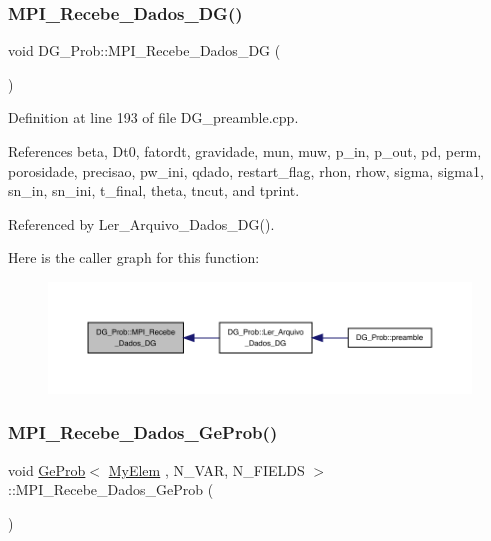 \subsubsection{\texorpdfstring{M\+P\+I\+\_\+\+Recebe\+\_\+\+Dados\+\_\+\+D\+G()}{MPI\_Recebe\_Dados\_DG()}}
{\footnotesize\ttfamily void D\+G\+\_\+\+Prob\+::\+M\+P\+I\+\_\+\+Recebe\+\_\+\+Dados\+\_\+\+DG (\begin{DoxyParamCaption}{ }\end{DoxyParamCaption})}



Definition at line 193 of file D\+G\+\_\+preamble.\+cpp.



References beta, Dt0, fatordt, gravidade, mun, muw, p\+\_\+in, p\+\_\+out, pd, perm, porosidade, precisao, pw\+\_\+ini, qdado, restart\+\_\+flag, rhon, rhow, sigma, sigma1, sn\+\_\+in, sn\+\_\+ini, t\+\_\+final, theta, tncut, and tprint.



Referenced by Ler\+\_\+\+Arquivo\+\_\+\+Dados\+\_\+\+D\+G().

Here is the caller graph for this function\+:
\nopagebreak
\begin{figure}[H]
\begin{center}
\leavevmode
\includegraphics[width=350pt]{classDG__Prob_a6941d468eec44d02bfd3f2eaedf661dc_icgraph}
\end{center}
\end{figure}
\mbox{\label{classGeProb_a79ef11abf1d43923fb5a3613a3fa654e}} 
\subsubsection{\texorpdfstring{M\+P\+I\+\_\+\+Recebe\+\_\+\+Dados\+\_\+\+Ge\+Prob()}{MPI\_Recebe\_Dados\_GeProb()}}
{\footnotesize\ttfamily void \hyperlink{classGeProb}{Ge\+Prob}$<$ \hyperlink{DG__Prob_8h_a83cd887ced9a6587428f267e50cd4787}{My\+Elem} , N\+\_\+\+V\+AR, N\+\_\+\+F\+I\+E\+L\+DS $>$\+::M\+P\+I\+\_\+\+Recebe\+\_\+\+Dados\+\_\+\+Ge\+Prob (\begin{DoxyParamCaption}{ }\end{DoxyParamCaption})\hspace{0.3cm}{\ttfamily [inherited]}}



